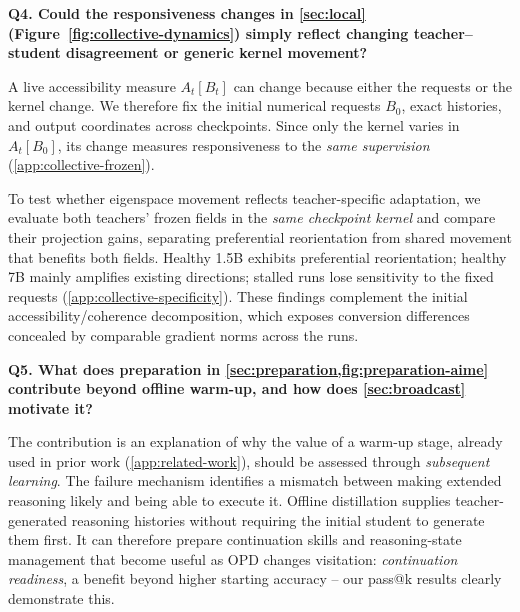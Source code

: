 \noindent\textbf{Q4. Could the responsiveness changes in \cref{sec:local} (Figure~\ref{fig:collective-dynamics}) simply reflect changing teacher--student disagreement or generic kernel movement?}
\par\noindent
A live accessibility measure $A_t[B_t]$ can change because either the requests or the kernel change. We therefore fix the initial numerical requests $B_0$, exact histories, and output coordinates across checkpoints. Since only the kernel varies in $A_t[B_0]$, its change measures responsiveness to the \emph{same supervision} (\cref{app:collective-frozen}).

To test whether eigenspace movement reflects teacher-specific adaptation, we evaluate both teachers' frozen fields in the \emph{same checkpoint kernel} and compare their projection gains, separating preferential reorientation from shared movement that benefits both fields. Healthy 1.5B exhibits preferential reorientation; healthy 7B mainly amplifies existing directions; stalled runs lose sensitivity to the fixed requests (\cref{app:collective-specificity}). These findings complement the initial accessibility/coherence decomposition, which exposes conversion differences concealed by comparable gradient norms across the runs.

\noindent\textbf{Q5. What does preparation in \cref{sec:preparation,fig:preparation-aime} contribute beyond offline warm-up, and how does \cref{sec:broadcast} motivate it?}
\par\noindent
The contribution is an explanation of why the value of a warm-up stage, already used in prior work (\cref{app:related-work}), should be assessed through \emph{subsequent learning}. The failure mechanism identifies a mismatch between making extended reasoning likely and being able to execute it. Offline distillation supplies teacher-generated reasoning histories without requiring the initial student to generate them first. It can therefore prepare continuation skills and reasoning-state management that become useful as OPD changes visitation: \emph{continuation readiness}, a benefit beyond higher starting accuracy -- our pass@k results clearly demonstrate this.

